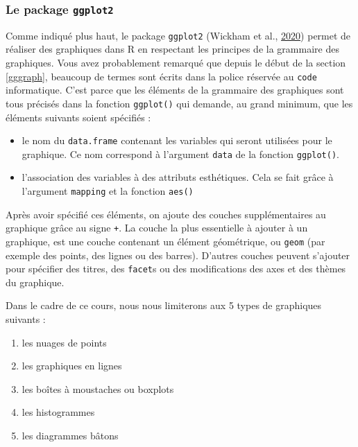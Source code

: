 \documentclass[
  a4paper,
]{article}
\providecommand{\tightlist}{%
  \setlength{\itemsep}{0pt}\setlength{\parskip}{0pt}}
\begin{document}
\hypertarget{le-package-ggplot2}{%
\subsubsection{\texorpdfstring{Le package \texttt{ggplot2}}{Le package ggplot2}}\label{le-package-ggplot2}}

Comme indiqué plus haut, le package \texttt{ggplot2} (Wickham et al., \protect\hyperlink{ref-R-ggplot2}{2020}) permet de réaliser des graphiques dans R en respectant les principes de la grammaire des graphiques. Vous avez probablement remarqué que depuis le début de la section \ref{gggraph}, beaucoup de termes sont écrits dans la police réservée au \texttt{code} informatique. C'est parce que les éléments de la grammaire des graphiques sont tous précisés dans la fonction \texttt{ggplot()} qui demande, au grand minimum, que les éléments suivants soient spécifiés :

\begin{itemize}
\tightlist
\item
  le nom du \texttt{data.frame} contenant les variables qui seront utilisées pour le graphique. Ce nom correspond à l'argument \texttt{data} de la fonction \texttt{ggplot()}.
\item
  l'association des variables à des attributs esthétiques. Cela se fait grâce à l'argument \texttt{mapping} et la fonction \texttt{aes()}
\end{itemize}

Après avoir spécifié ces éléments, on ajoute des couches supplémentaires au graphique grâce au signe \texttt{+}. La couche la plus essentielle à ajouter à un graphique, est une couche contenant un élément géométrique, ou \texttt{geom} (par exemple des points, des lignes ou des barres). D'autres couches peuvent s'ajouter pour spécifier des titres, des \texttt{facet}s ou des modifications des axes et des thèmes du graphique.

Dans le cadre de ce cours, nous nous limiterons aux 5 types de graphiques suivants :

\begin{enumerate}
\def\labelenumi{\arabic{enumi}.}
\tightlist
\item
  les nuages de points
\item
  les graphiques en lignes
\item
  les boîtes à moustaches ou boxplots
\item
  les histogrammes
\item
  les diagrammes bâtons
\end{enumerate}
\end{document}
